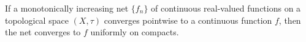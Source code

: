 \documentclass{article}
\begin{document}
If a monotonically increasing net $\{ f_n\}$ of continuous real-valued functions on a topological space $(X,\tau)$ converges pointwise to a continuous function $f$, then the net converges to $f$ uniformly on compacts.
\end{document}
